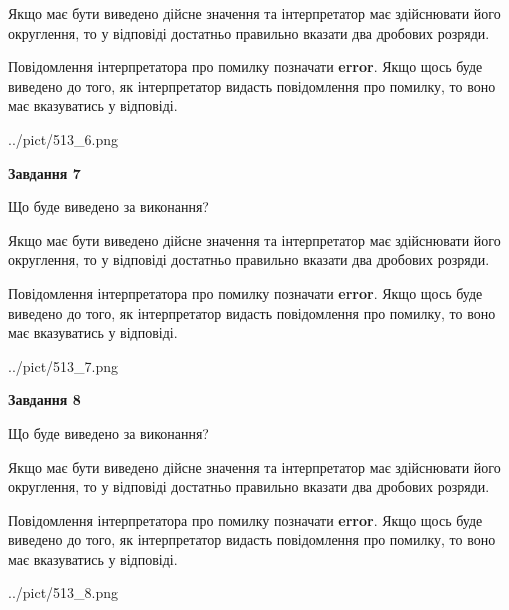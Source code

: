 \documentclass[12pt, ukrainian]{article}
\begin{document}
{\begin {Large}
Якщо має бути виведено дійсне значення та інтерпретатор має здійснювати його округлення, 
то у відповіді достатньо правильно вказати два дробових розряди.

Повідомлення інтерпретатора про помилку позначати \textbf{error}.
Якщо щось буде виведено до того, як інтерпретатор видасть повідомлення про помилку, 
то воно має вказуватись у відповіді. \par

\begin{center}
	{../pict/513_6.png}
\end{center}
\newpage

{\begin {center}\textbf{Завдання 7}\end {center}}\par
Що буде виведено за виконання? \par

Якщо має бути виведено дійсне значення та інтерпретатор має здійснювати його округлення, 
то у відповіді достатньо правильно вказати два дробових розряди.

Повідомлення інтерпретатора про помилку позначати \textbf{error}.
Якщо щось буде виведено до того, як інтерпретатор видасть повідомлення про помилку, 
то воно має вказуватись у відповіді. \par

\begin{center}
	{../pict/513_7.png}
\end{center}
\newpage

{\begin {center}\textbf{Завдання 8}\end {center}}\par
Що буде виведено за виконання? \par

Якщо має бути виведено дійсне значення та інтерпретатор має здійснювати його округлення, 
то у відповіді достатньо правильно вказати два дробових розряди.

Повідомлення інтерпретатора про помилку позначати \textbf{error}.
Якщо щось буде виведено до того, як інтерпретатор видасть повідомлення про помилку, 
то воно має вказуватись у відповіді. \par

\begin{center}
	{../pict/513_8.png}
\end{center}
\newpage


\end{Large}}
\end{document}
